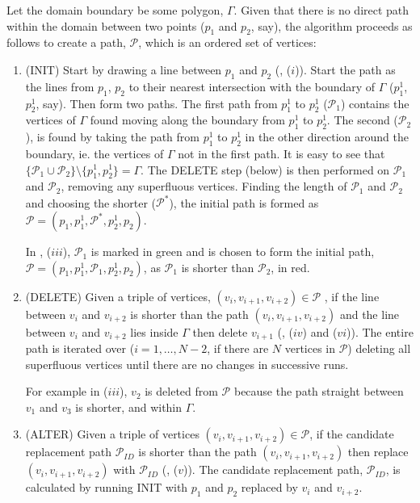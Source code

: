 Let the domain boundary be some polygon, $\Gamma$. Given that there is no direct path within the domain between two points ($p_1$ and $p_2$, say), the algorithm proceeds as follows to create a path, $\mathcal{P}$, which is an ordered set of vertices:
\begin{enumerate}
\item (INIT) Start by drawing a line between $p_1$ and $p_2$ (, ($i$)). Start the path as the lines from $p_1$, $p_2$ to their nearest intersection with the boundary of $\Gamma$ ($p_1^1$, $p_2^1$, say). Then form two paths. The first path from $p_1^1$ to $p_2^1$ ($\mathcal{P}_1$) contains the vertices of $\Gamma$ found moving along the boundary from $p_1^1$ to $p_2^1$. The second ($\mathcal{P}_2$), is found by taking the path from $p_1^1$ to $p_2^1$ in the other direction around the boundary, ie. the vertices of $\Gamma$ not in the first path. It is easy to see that $\{\mathcal{P}_1 \cup \mathcal{P}_2\} \setminus \{p_1^1, p_2^1\} = \Gamma$. The DELETE step (below) is then performed on $\mathcal{P}_1$ and $\mathcal{P}_2$, removing any superfluous vertices. Finding the length of $\mathcal{P}_1$ and $\mathcal{P}_2$ and choosing the shorter ($\mathcal{P^*}$), the initial path is formed as $\mathcal{P}=(p_1,p_1^1,\mathcal{P}^*,p_2^1,p_2)$. 

In , ($iii$), $\mathcal{P}_1$ is marked in green and is chosen to form the initial path, $\mathcal{P}=(p_1,p_1^1,\mathcal{P}_1,p_2^1,p_2)$, as $\mathcal{P}_1$ is shorter than $\mathcal{P}_2$, in red.

\item (DELETE) Given a triple of vertices, $(v_i, v_{i+1}, v_{i+2}) \in \mathcal{P}$ , if the line between $v_i$ and $v_{i+2}$ is shorter than the path $(v_i, v_{i+1}, v_{i+2})$ and the line between $v_i$ and $v_{i+2}$ lies inside $\Gamma$ then delete $v_{i+1}$ (, ($iv$) and ($vi$)). The entire path is iterated over ($i=1,\ldots,N-2$, if there are $N$ vertices in $\mathcal{P}$)  deleting all superfluous vertices until there are no changes in successive runs. 

For example in  ($iii$), $v_2$ is deleted from $\mathcal{P}$ because the path straight between $v_1$ and $v_3$ is shorter, and within $\Gamma$.

\item (ALTER) Given a triple of vertices $(v_i, v_{i+1}, v_{i+2}) \in \mathcal{P}$, if the candidate replacement path $\mathcal{P}_{ID}$ is shorter than the path $(v_i, v_{i+1}, v_{i+2})$ then replace $(v_i, v_{i+1}, v_{i+2})$ with $\mathcal{P}_{ID}$ (, ($v$)). The candidate replacement path, $\mathcal{P}_{ID}$, is calculated by running INIT with $p_1$ and $p_2$ replaced by $v_i$ and $v_{i+2}$.


\end{enumerate}
